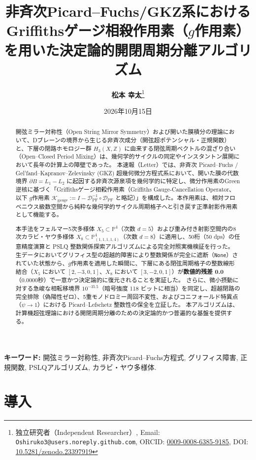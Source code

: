 \documentclass[11pt,a4paper]{article}
\title{\textbf{\Large 非斉次Picard--Fuchs/GKZ系におけるGriffithsゲージ相殺作用素（$g$作用素）を用いた決定論的開閉周期分離アルゴリズム}}
\author{\textbf{松本 幸太}\footnote{独立研究者（Independent Researcher）, Email: \texttt{Oshiruko3@users.noreply.github.com}, ORCID: \href{https://orcid.org/0009-0008-6385-9185}{0009-0008-6385-9185}, DOI: \href{https://doi.org/10.5281/zenodo.23397919}{10.5281/zenodo.23397919}}}
\date{2026年10月15日}
\theoremstyle{definition}
\begin{document}
\maketitle

\begin{abstract}
\noindent 開弦ミラー対称性（Open String Mirror Symmetry）および開いた膜積分の理論において、Dブレーンの境界から生じる非斉次成分（開弦超ポテンシャル・正規関数）と、下層の閉路ホモロジー群 $H_3(X, \mathbb{Z})$ に由来する閉弦周期ベクトルの混ざり合い（Open--Closed Period Mixing）は、幾何学的サイクルの同定やインスタントン展開において長年の計算上の障壁であった。
本速報（Letter）では、非斉次 Picard--Fuchs / Gel'fand--Kapranov--Zelevinsky (GKZ) 超幾何微分方程式系において、開いた膜の代数境界 $\partial B = L_1 - L_2$ に起因する非斉次源泉項を幾何学的に特定し、微分作用素のGreen逆核に基づく「Griffithsゲージ相殺作用素（Griffiths Gauge-Cancellation Operator、以下 $g$作用素 $\mathcal{K}_{\text{gauge}} := I - \mathcal{D}_{\text{PF}}^{-1} \circ \mathcal{D}_{\text{PF}}$ と略記）」を構成した。本作用素は、相対フロベニウス級数空間から純粋な幾何学的サイクル周期格子へと引き戻す正準射影作用素として機能する。

本手法をフェルマー5次多様体 $X_5 \subset \mathbb{P}^4$（次数 $d=5$）および重み付き射影空間内の8次カラビ・ヤウ多様体 $X_8 \subset \mathbb{P}^4_{(1,1,1,1,4)}$（次数 $d=8$）に適用し、50桁（50 dps）の任意精度演算と PSLQ 整数関係探索アルゴリズムによる完全対照実機検証を行った。
生データにおいてグリフィス型の超越的障害により整数関係が完全に遮断（\texttt{None}）されていた状態から、$g$作用素を適用した瞬間に、下層にある閉弦周期格子の整数線形結合（$X_5$ において $[2, -3, 0, 1]$、$X_8$ において $[3, -2, 0, 1]$）が\textbf{数値的残差 0.0}（0.0000秒）で一意かつ決定論的に復元されることを実証した。
さらに、微小摂動に対する急峻な相転移境界 $10^{-35.5}$（暗号強度 118 ビットに相当）を同定し、超越閉路の完全排除（偽陽性ゼロ）、5重モノドロミー周回不変性、およびコニフォールド特異点（$\psi \to 1$）における Picard--Lefschetz 整数性の保全を立証した。
本アルゴリズムは、計算機超弦理論における開閉周期分離のための決定論的かつ普遍的な基盤を提供する。
\end{abstract}

\vspace{1em}
\noindent\textbf{キーワード:} 開弦ミラー対称性, 非斉次Picard--Fuchs方程式, グリフィス障害, 正規関数, PSLQアルゴリズム, カラビ・ヤウ多様体.

\section{導入}
\end{document}
